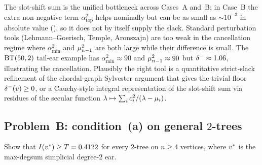 The slot-shift sum is the unified bottleneck across Cases~A and~B; in
Case~B the extra non-negative term $\alpha_{\text{top}}^{2}$ helps
nominally but can be as small as $\sim 10^{-3}$ in absolute value
(), so it does not by itself supply the slack.
Standard perturbation tools (Lehmann--Goerisch, Temple, Aronszajn) are
too weak in the cancellation regime where $\alpha_{\min}^{2}$ and
$\mu_{n-1}^{2}$ are both large while their difference is small. The
$\mathrm{BT}(50,2)$ tail-ear example has $\alpha_{\min}^{2} \approx 90$ and
$\mu_{n-1}^{2} \approx 90$ but $\delta^{-} \approx 1.06$, illustrating
the cancellation. Plausibly the right tool is a quantitative
strict-slack refinement of the chordal-graph Sylvester argument that
gives the trivial floor $\delta^{-}(v) \ge 0$, or a Cauchy-style integral
representation of the slot-shift sum via residues of the secular
function $\lambda \mapsto \sum_{i} c_{i}^{2}/(\lambda - \mu_{i})$.

\subsection{Problem~B: condition~(a) on general $2$-trees}\label{sec:open:general-a}

\begin{problem}\label{prob:general-a}
Show that $I(v^{*}) \ge T = 0.4122$ for every $2$-tree on
$n \ge 4$ vertices, where $v^{*}$ is the max-degsum simplicial
degree-$2$ ear.
\end{problem}

